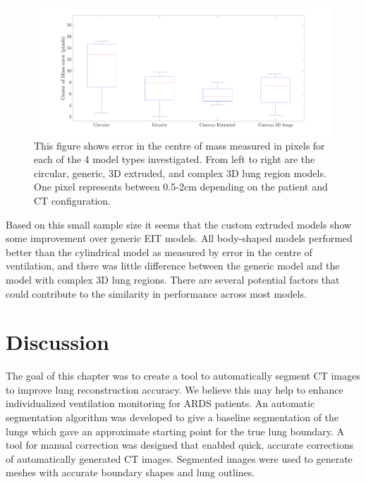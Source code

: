 \begin{figure}[H]
	\centering
	\includegraphics[width=\textwidth]{chapter5-CT_to_mesh/imgs/error_boxplot.pdf}
	\caption[Center of mass error]{\label{fig:c-of-m-error}%
	This figure shows error in the centre of mass measured in pixels for each of the 4 model types investigated.
	From left to right are the circular, generic, 3D extruded, and complex 3D lung region models. 
	One pixel represents between 0.5-2cm depending on the patient and CT configuration.
	}
\end{figure}

Based on this small sample size it seems that the custom extruded models show some improvement 
over generic EIT models. 
All body-shaped models performed better than the cylindrical model 
as measured by error in the centre of ventilation,
and there was little difference between the generic model and the model with complex 3D lung regions. 
There are several potential factors that could contribute to the similarity in performance across
most models. 

\section{Discussion}
The goal of this chapter was to create a tool to automatically segment CT images 
to improve lung reconstruction accuracy. 
We believe this may help to enhance individualized ventilation monitoring for ARDS patients. 
An automatic segmentation algorithm was developed to give a baseline segmentation of the lungs which 
gave an approximate starting point for the true lung boundary. A tool for manual correction was designed 
that enabled quick, accurate corrections of automatically generated CT images. 
Segmented images were used to generate meshes with accurate boundary  shapes and lung outlines. 

